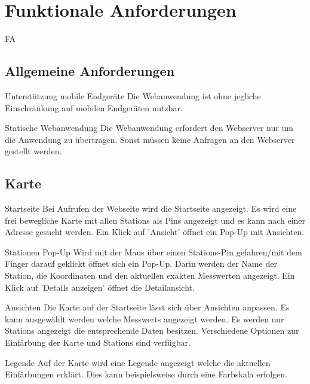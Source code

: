 \section{Funktionale Anforderungen}

\setcounter{counter}{10}
\begin{Kriterien}{FA}

\subsection{Allgemeine Anforderungen}

 \item[Unterstützung mobile Endgeräte]
   Die \gls{Webanwendung} ist ohne jegliche Einschränkung auf mobilen Endgeräten nutzbar.  

 \item[Statische Webanwendung]
   Die \gls{Webanwendung} erfordert den \gls{Webserver} nur um die Anwendung zu übertragen.
   Sonst müssen keine Anfragen an den \gls{Webserver} gestellt werden. 

\subsection{Karte}

 \item[Startseite]
   Bei Aufrufen der Webseite wird die Startseite angezeigt.
   Es wird eine frei bewegliche Karte mit allen \glspl{Station} als \glspl{Pin} angezeigt und es kann nach einer Adresse gesucht werden.
   Ein Klick auf 'Ansicht' öffnet ein \gls{Pop-Up} mit Ansichten.

 \item[Stationen Pop-Up]
  Wird mit der Maus über einen Stations-\gls{Pin} gefahren/mit dem Finger darauf geklickt öffnet sich ein \gls{Pop-Up}.
  Darin werden der Name der \gls{Station}, die Koordinaten und den aktuellen exakten Messwerten angezeigt.
  Ein Klick auf 'Details anzeigen' öffnet die Detailansicht.

 \item[Ansichten]
   Die Karte auf der Startseite lässt sich über Ansichten anpassen.
   Es kann ausgewählt werden welche \glspl{Messwert} angezeigt werden.
   Es werden nur \glspl{Station} angezeigt die entsprechende Daten besitzen.
   Verschiedene Optionen zur Einfärbung der Karte und \glspl{Station} sind verfügbar.

 \item[Legende]
  Auf der Karte wird eine Legende angezeigt welche die aktuellen Einfärbungen erklärt.
  Dies kann beispielsweise durch eine Farbskala erfolgen.


\end{Kriterien}
